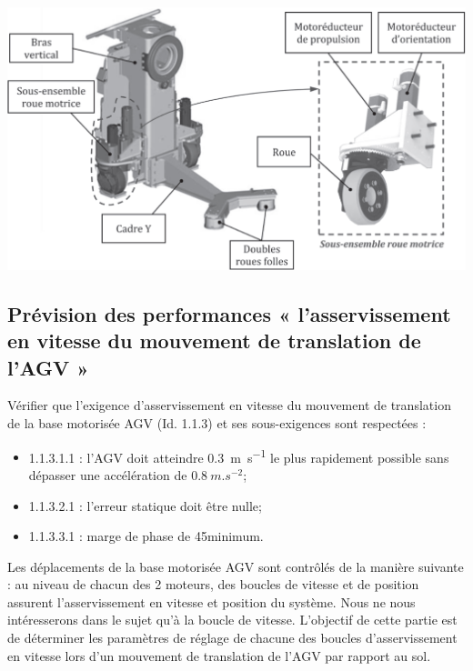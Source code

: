 \begin{multicols}{2}
\begin{multicols}{2}
\begin{center}
\includegraphics[width=.8\linewidth]{images/ccp_06}
\end{center}

\subsection*{Prévision des performances « l’asservissement en vitesse du mouvement de translation de
l’AGV »}

\begin{obj}
Vérifier que l’exigence d’asservissement en vitesse du mouvement de translation de la base motorisée
AGV (Id. 1.1.3) et ses sous-exigences sont respectées :
\begin{itemize}
\item 1.1.3.1.1 : l'AGV doit atteindre \SI{0,3}{m.s^{-1}} le plus rapidement possible sans dépasser une accélération de $\SI{0,8}{m.s^{-2}}$;
\item 1.1.3.2.1 : l'erreur statique doit être nulle;
\item 1.1.3.3.1 : marge de phase de 45\degres minimum.
\end{itemize}
\end{obj}
Les déplacements de la base motorisée AGV sont contrôlés de la manière suivante : au niveau de
chacun des 2 moteurs, des boucles de vitesse et de position assurent l’asservissement en vitesse et
position du système. Nous ne nous intéresserons dans le sujet qu’à la boucle de vitesse. L’objectif de
cette partie est de déterminer les paramètres de réglage de chacune des boucles d’asservissement en
vitesse lors d’un mouvement de translation de l’AGV par rapport au sol.


\end{multicols}
\end{multicols}
